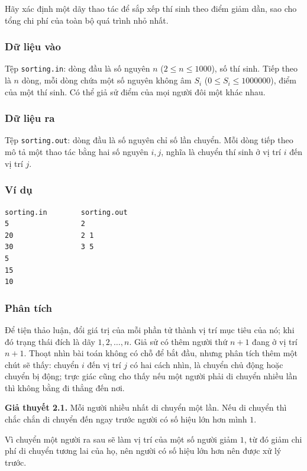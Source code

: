 \documentclass[11pt]{article}
\begin{document}
Hãy xác định một dãy thao tác để sắp xếp thí sinh theo điểm giảm dần, sao cho
tổng chi phí của toàn bộ quá trình nhỏ nhất.

\subsubsection*{Dữ liệu vào}

Tệp \texttt{sorting.in}: dòng đầu là số nguyên $n$ ($2\le n\le 1000$), số
thí sinh. Tiếp theo là $n$ dòng, mỗi dòng chứa một số nguyên không âm $S_i$
($0\le S_i\le 1000000$), điểm của một thí sinh. Có thể giả sử điểm của mọi
người đôi một khác nhau.

\subsubsection*{Dữ liệu ra}

Tệp \texttt{sorting.out}: dòng đầu là số nguyên chỉ số lần chuyển. Mỗi dòng
tiếp theo mô tả một thao tác bằng hai số nguyên $i,j$, nghĩa là chuyển thí
sinh ở vị trí $i$ đến vị trí $j$.

\subsubsection*{Ví dụ}

\begin{verbatim}
sorting.in        sorting.out
5                 2
20                2 1
30                3 5
5
15
10
\end{verbatim}

\subsubsection*{Phân tích}

Để tiện thảo luận, đổi giá trị của mỗi phần tử thành vị trí mục tiêu của nó;
khi đó trạng thái đích là dãy $1,2,\ldots,n$. Giả sử có thêm người thứ $n+1$
đang ở vị trí $n+1$. Thoạt nhìn bài toán không có chỗ để bắt đầu, nhưng phân
tích thêm một chút sẽ thấy: chuyển $i$ đến vị trí $j$ có hai cách nhìn, là
chuyển chủ động hoặc chuyển bị động; trực giác cũng cho thấy nếu một người
phải di chuyển nhiều lần thì không bằng đi thẳng đến nơi.

\noindent\textbf{Giả thuyết 2.1.} Mỗi người nhiều nhất di chuyển một lần. Nếu
di chuyển thì chắc chắn di chuyển đến ngay trước người có số hiệu lớn hơn mình
$1$.

Vì chuyển một người ra sau sẽ làm vị trí của một số người giảm $1$, từ đó giảm
chi phí di chuyển tương lai của họ, nên người có số hiệu lớn hơn nên được xử
lý trước.
\end{document}
